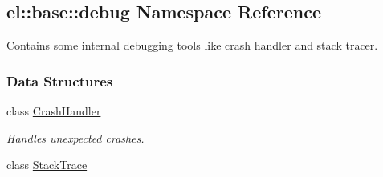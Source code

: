 \hypertarget{a00186}{}\subsection{el\+:\+:base\+:\+:debug Namespace Reference}
\label{a00186}


Contains some internal debugging tools like crash handler and stack tracer.  


\subsubsection*{Data Structures}
\begin{DoxyCompactItemize}
\item 
class \hyperlink{a00016}{Crash\+Handler}
\begin{DoxyCompactList}\small\item\em Handles unexpected crashes. \end{DoxyCompactList}\item 
class \hyperlink{a00082}{Stack\+Trace}
\end{DoxyCompactItemize}
